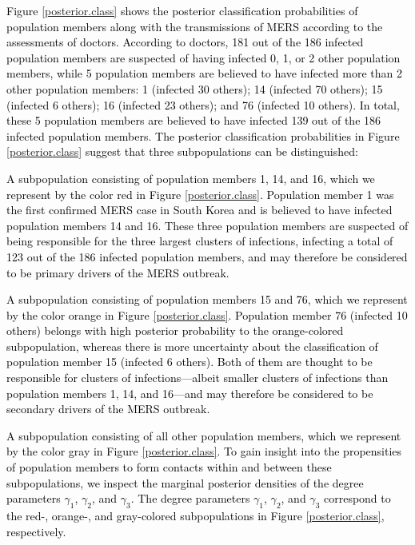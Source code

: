 \documentclass[12pt,usenatbib,referee]{article}
\renewcommand{\alert}{\textcolor{black}}
\begin{document}
\alert{Figure \ref{posterior.class} shows the posterior classification probabilities of population members along with the transmissions of MERS according to the assessments of doctors.
According to doctors,
181 out of the 186 infected population members are suspected of having infected 0, 1, or 2 other population members,
while 5 population members are believed to have infected more than 2 other population members:
1 (infected 30 others); 
14 (infected 70 others); 
15 (infected 6 others); 
16 (infected 23 others); 
and 76 (infected 10 others).
In total,
these 5 population members are believed to have infected 139 out of the 186 infected population members.
The posterior classification probabilities in Figure \ref{posterior.class} suggest that three subpopulations can be distinguished:
\bi
\item A subpopulation consisting of population members 1, 14, and 16,
which we represent by the color red in Figure \ref{posterior.class}.
Population member 1 was the first confirmed MERS case in South Korea and is believed to have infected population members 14 and 16.
These three population members are suspected of being responsible for the three largest clusters of infections,
infecting a total of 123 out of the 186 infected population members,
and may therefore be considered to be primary drivers of the MERS outbreak.
\item A subpopulation consisting of population members 15 and 76,
which we represent by the color orange in Figure \ref{posterior.class}.
Population member 76 (infected 10 others) belongs with high posterior probability to the orange-colored subpopulation,
whereas there is more uncertainty about the classification of population member 15 (infected 6 others).
Both of them are thought to be responsible for clusters of infections---albeit smaller clusters of infections than population members 1, 14, and 16---and may therefore be considered to be secondary drivers of the MERS outbreak.
\item A subpopulation consisting of all other population members,
which we represent by the color gray in Figure \ref{posterior.class}.
\ei
To gain insight into the propensities of population members to form contacts within and between these subpopulations,
we inspect the marginal posterior densities of the degree parameters $\gamma_1$, $\gamma_2$, and $\gamma_3$.
The degree parameters $\gamma_1$, $\gamma_2$, and $\gamma_3$ correspond to the red-,
orange-,
and gray-colored subpopulations in Figure \ref{posterior.class},
respectively.
\begin{figure}[t]

\end{figure}}
\end{document}
